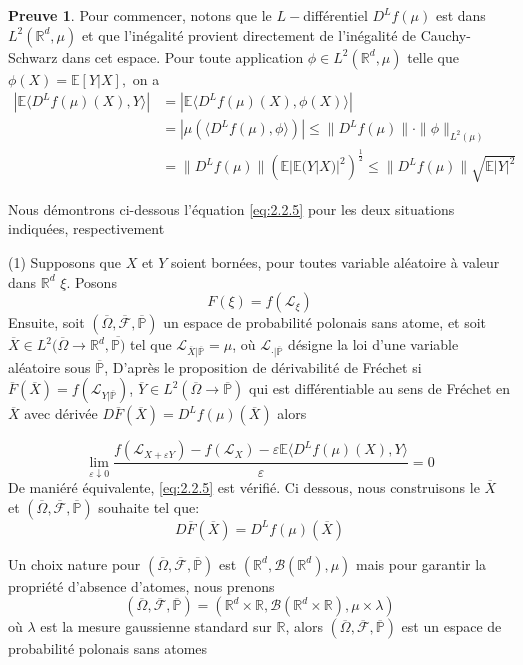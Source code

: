 \documentclass[12pt,a4paper,twoside,fleqn]{book}%
\theoremstyle{definition}
\newtheorem*{pr}{\textbf{Preuve}}
\theoremstyle{lemme}
\numberwithin{equation}{section}
\begin{document}
\begin{pr}
	Pour commencer, notons que le $L-$différentiel $D^Lf(\mu)$ est dans $L^2(\mathbb{R}^d,\mu)$ et que l'inégalité provient directement de l'inégalité de Cauchy-Schwarz dans cet espace. Pour toute application $\phi\in L^2(\mathbb{R}^d,\mu)$ telle que $\phi(X)=\mathbb{E}[Y|X],$ on a
	\[
	\begin{aligned}
	|\mathbb{E} \langle D^Lf(\mu)(X),Y \rangle| &= |\mathbb{E}\langle D^Lf(\mu)(X),\phi(X)\rangle |\\ &= |\mu(\langle D^Lf(\mu),\phi\rangle)|\leq \|D^Lf(\mu)\|\cdot\|\phi\|_{L^2(\mu)}\\&=
	\|D^Lf(\mu)\|\left(\mathbb{E}|\mathbb{E}(Y|X)|^2\right)^{\frac{1}{2}}\leq \|D^Lf(\mu)\|\sqrt{\mathbb{E}|Y|^2}
	\end{aligned}
	\] 
	
	Nous démontrons ci-dessous l'équation \ref{eq:2.2.5} pour les deux situations indiquées, respectivement
	
	(1) Supposons que $X$ et $Y$ soient bornées, pour toutes variable aléatoire à valeur dans $\mathbb{R}^d$ $\xi$. Posons
	\[
	F(\xi) = f(\mathcal{L}_\xi)\]
	Ensuite, soit $(\overline{\Omega},\overline{\mathcal{F}},\overline{\mathbb{P}})$ un espace de probabilité polonais sans atome, et soit $\overline{X}\in L^2(\overline{\Omega}\to \mathbb{R}^d,\overline{\mathbb{P})}$ tel que $\mathcal{L}_{\overline{X}|\overline{\mathbb{P}}}=\mu$, où $\mathcal{L}_{\cdot|\overline{\mathbb{P}}}$ désigne la loi d'une variable aléatoire sous $\overline{\mathbb{P}}$, D'après le proposition de dérivabilité de Fréchet si $\overline{F}(\overline{X}) = f(\mathcal{L}_{Y|\overline{\mathbb{P}}})$, $\overline{Y}\in L^2(\overline{\Omega}\to \mathbb{\overline{P}})$ qui est différentiable au sens de Fréchet en $\overline{X}$ avec dérivée $D\overline{F}(\overline{X}) = D^Lf(\mu)(\overline{X})$ alors
	
	\begin{equation}\label{eq:2.2.7}
		\lim_{\varepsilon\downarrow 0}\frac{f(\mathcal{L}_{X+\varepsilon Y})- f(\mathcal{L}_X)-\varepsilon\mathbb{E}\langle D^Lf(\mu)(X),Y\rangle}{\varepsilon} = 0
	\end{equation}
	De maniéré équivalente,  \ref{eq:2.2.5} est vérifié. Ci dessous, nous construisons le $\overline{X}$ et $(\overline{\Omega},\overline{\mathcal{F}},\overline{\mathbb{P}})$
	souhaite tel que:
	\[ D\overline{F}(\overline{X}) = D^Lf(\mu)(\overline{X})\]
	
	Un choix nature pour $(\overline{\Omega},\overline{\mathcal{F}},\overline{\mathbb{P}})$ est $(\mathbb{R}^d,\mathcal{B}(\mathbb{R}^d),\mu)$ mais pour garantir la propriété d'absence d’atomes, nous prenons
	\[
	(\overline{\Omega},\overline{\mathcal{F}},\overline{\mathbb{P}}) = (\mathbb{R}^d\times\mathbb{R}, \mathcal{B}(\mathbb{R}^d\times\mathbb{R}), \mu\times\lambda)
	\]
	où $\lambda$ est la mesure gaussienne standard sur $\mathbb{R}$, alors $(\overline{\Omega},\overline{\mathcal{F}},\overline{\mathbb{P}})$ est un espace de probabilité polonais sans atomes
	

\end{pr}
\end{document}
